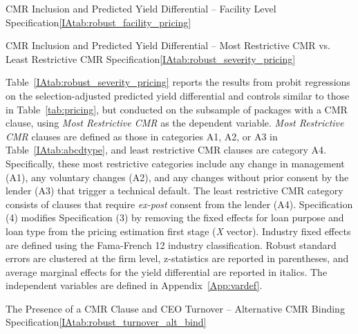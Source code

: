 \documentclass[12pt]{article}
\begin{document}
\begin{appendices}
\begin{singlespace}
\begin{papertable}{CMR Inclusion and Predicted Yield Differential -- Facility Level Specification}{\ref{IAtab:robust_facility_pricing}}{}
  \startdata
  

\end{papertable}



\begin{papertable}{CMR Inclusion and Predicted Yield Differential -- Most Restrictive CMR vs. Least Restrictive CMR Specification}{\ref{IAtab:robust_severity_pricing}}{}
  \label{IAtab:robust_severity_pricing}

    Table~\ref{IAtab:robust_severity_pricing} reports the results from probit regressions on the selection-adjusted predicted yield differential and controls similar to those in Table~\ref{tab:pricing}, but conducted on the subsample of packages with a CMR clause, using \textit{Most Restrictive CMR} as the dependent variable.
    \textit{Most Restrictive CMR} clauses are defined as those in categories A1, A2, or A3 in Table~\ref{IAtab:abcdtype}, and least restrictive CMR clauses are category A4.
    Specifically, these most restrictive categories include any change in management (A1), any voluntary changes (A2), and any changes without prior consent by the lender (A3) that trigger a technical default.
    The least restrictive CMR category consists of clauses that require \textit{ex-post} consent from the lender (A4).
    Specification (4) modifies Specification (3) by removing the fixed effects for loan purpose and loan type from the pricing estimation first stage (\textit{X} vector).
    Industry fixed effects are defined using the Fama-French 12 industry classification.
    Robust standard errors are clustered at the firm level, z-statistics are reported in parentheses, and average marginal effects for the yield differential are reported in italics.
    The independent variables are defined in Appendix~\ref{App:vardef}.
    \postamblesig

    \startdata
    

\end{papertable}





\begin{papertable}{The Presence of a CMR Clause and CEO Turnover -- Alternative CMR Binding Specification}{\ref{IAtab:robust_turnover_alt_bind}}{}
  \label{IAtab:robust_turnover_alt_bind}


\end{papertable}
\end{singlespace}
\end{appendices}
\end{document}
